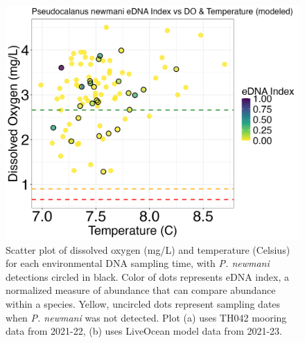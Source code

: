 \documentclass[12pt,twoside]{reedthesis}
\begin{document}
	\begin{figure}[!h]
		\begin{center}
			\includegraphics[scale=0.3]{Pnewmani_Scatter_AllYr_mod_noOut}
			\caption[\textit{P. newmani} scatterplot]{\footnotesize{Scatter plot of dissolved oxygen (mg/L) and temperature (Celsius) for each environmental DNA sampling time, with \textit{P. newmani} detections circled in black. Color of dots represents eDNA index, a normalized measure of abundance that can compare abundance within a species. Yellow, uncircled dots represent sampling dates when \textit{P. newmani} was not detected. Plot (a) uses TH042 mooring data from 2021-22, (b) uses LiveOcean model data from 2021-23.}} %
			\label{PnewmaniScatter}
		\end{center}
	\end{figure} 
	
\end{document}
